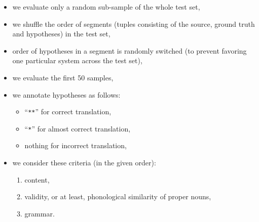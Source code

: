 \begin{itemize}
	\item we evaluate only a random sub-sample of the whole test set,
	\item we shuffle the order of segments (tuples consisting of the source, ground truth and hypotheses) in the test set,
	\item order of hypotheses in a segment is randomly switched (to prevent favoring one particular system across the test set),
	\item we evaluate the first 50 samples, 
	\item we annotate hypotheses as follows:
	\begin{itemize}
		\item ``\texttt{**}'' for correct translation,
		\item ``\texttt{*}'' for almost correct translation,
		\item nothing for incorrect translation,
	\end{itemize}
	\item we consider these criteria (in the given order):
	\begin{enumerate}
		\item content,
		\item validity, or at least, phonological similarity of proper nouns,
		\item grammar.
	\end{enumerate}
\end{itemize}

